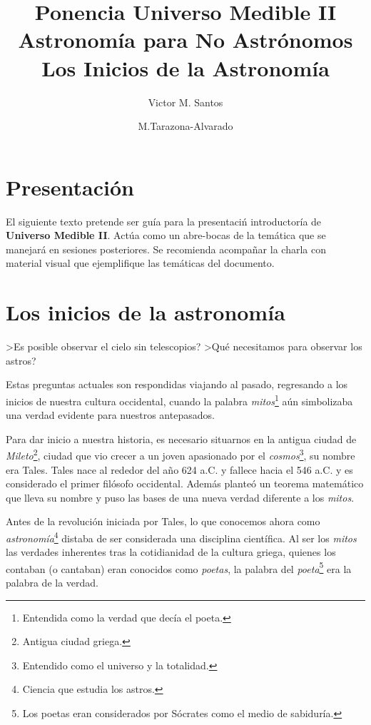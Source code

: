 \documentclass[12pt,a4paper]{article}
\author{Victor M. Santos \and M.Tarazona-Alvarado}
\title{\textbf{Ponencia Universo Medible II }\\ Astronom\'ia para No Astr\'onomos \\ Los Inicios de la Astronom\'ia}
\begin{document}
\maketitle


\section*{Presentaci\'on}

El siguiente texto pretende ser gu\'ia para la presentaci\'n introductor\'ia de \textbf{Universo Medible II}. Act\'ua como un abre-bocas de la tem\'atica que se manejar\'a en sesiones posteriores. Se recomienda acompa\~nar la charla con material visual que ejemplifique las tem\'aticas del documento.

\section*{Los inicios de la astronom\'ia}  

>Es posible observar el cielo sin telescopios? >Qu\'e necesitamos para observar los astros?

\medskip 

Estas preguntas actuales son respondidas viajando al pasado, regresando a los inicios de nuestra cultura occidental, cuando la palabra \textit{mitos}\footnote{Entendida como la verdad que dec\'ia el poeta.} a\'un simbolizaba una verdad evidente para nuestros antepasados.

\medskip 

Para dar inicio a nuestra historia, es necesario situarnos en la antigua ciudad de \textit{Mileto}\footnote{Antigua ciudad griega.}, ciudad que vio crecer a un joven apasionado por el \textit{cosmos}\footnote{Entendido como el universo y la totalidad.}, su nombre era Tales. Tales nace al rededor del a\~no 624 a.C. y fallece hacia el 546 a.C. y es considerado el primer fil\'osofo occidental. Adem\'as plante\'o un teorema matem\'atico que lleva su nombre y puso las bases de una nueva verdad diferente a los \textit{mitos}.

\medskip 

Antes de la revoluci\'on iniciada por Tales, lo que conocemos ahora como \textit{astronom\'ia}\footnote{Ciencia que estudia los astros.} distaba de ser considerada una disciplina cient\'ifica. Al ser los \textit{mitos} las verdades inherentes tras la cotidianidad de la cultura griega, quienes los contaban (o cantaban) eran conocidos como \textit{poetas}, la palabra del \textit{poeta}\footnote{Los poetas eran considerados por S\'ocrates como el medio de sabidur\'ia.} era la palabra de la verdad.
\end{document}
